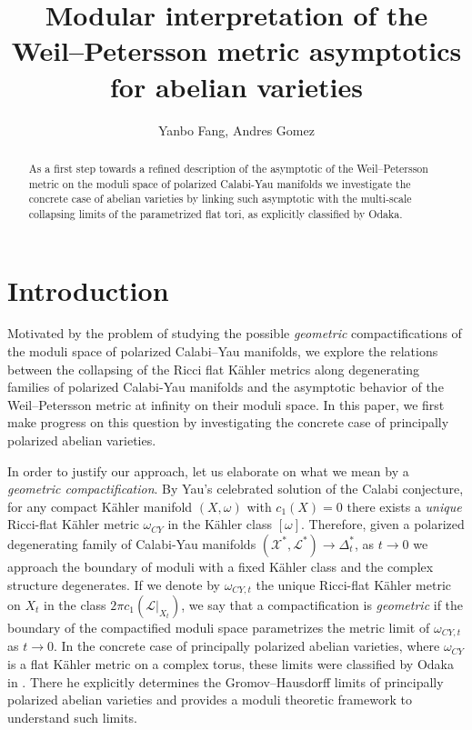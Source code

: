 \documentclass[11pt]{amsart}
\title[Modular interpretation of the Weil--Petersson metric]{Modular interpretation of the Weil--Petersson metric asymptotics for abelian varieties}
\author{Yanbo Fang, Andres Gomez}
\date{}
\theoremstyle{plain}
\theoremstyle{definition}
\theoremstyle{remark}
\begin{document}
\begin{abstract}
   As a first step towards a refined description of the asymptotic of the Weil--Petersson metric on the moduli space of polarized Calabi-Yau manifolds we investigate the concrete case of abelian varieties by linking such asymptotic with the multi-scale collapsing limits of the parametrized flat tori, as explicitly classified by Odaka.   
\end{abstract}
\maketitle
\section{Introduction}
Motivated by the problem of studying the possible \emph{geometric} compactifications of the moduli space of polarized Calabi–Yau manifolds, we explore the relations between the collapsing of the  Ricci flat Kähler metrics along degenerating families of polarized Calabi-Yau manifolds and the asymptotic behavior of the Weil--Petersson metric at infinity on their moduli space. In this paper, we first make progress on this question by investigating the concrete case of principally polarized abelian varieties.

In order to justify our approach, let us elaborate on what we mean by a \emph{geometric compactification}. By Yau's celebrated solution of the Calabi conjecture, for any compact K\"ahler manifold $(X,\omega)$ with $c_1(X)=0$ there exists a \emph{unique} Ricci-flat K\"ahler metric $\omega_{\scriptscriptstyle{CY}}$ in the K\"ahler class $[\omega]$. Therefore, given a polarized degenerating family of Calabi-Yau manifolds $(\mathcal X^*, \mathcal L^*)\rightarrow \Delta^*_t$, as $t\to 0$ we approach the boundary of moduli with a fixed K\"ahler class and the complex structure degenerates. If we denote by $\omega_{\scriptscriptstyle{CY, t}}$ the unique Ricci-flat K\"ahler metric on $X_t$ in the class $2\pi c_1(\mathcal L|_{X_t})$, we say that a compactification is \emph{geometric} if the boundary of the compactified moduli space parametrizes the metric limit of $\omega_{\scriptscriptstyle{CY,t}}$ as $t\to 0$. In the concrete case of principally polarized abelian varieties, where $\omega_{\scriptscriptstyle{CY}}$ is a flat K\"ahler metric on a complex torus, these limits were classified by Odaka in \cite{Odaka2019}. There he explicitly determines the Gromov--Hausdorff limits of principally polarized abelian varieties and provides a moduli theoretic framework to understand such limits.
\end{document}
